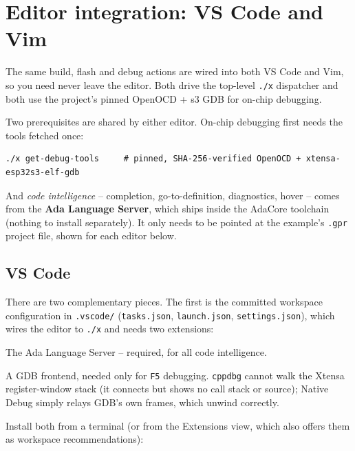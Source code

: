 \section{Editor integration: VS Code and Vim}

The same build, flash and debug actions are wired into both VS Code and Vim, so
you need never leave the editor. Both drive the top-level \texttt{./x} dispatcher
and both use the project's pinned OpenOCD + s3 GDB for on-chip debugging.

Two prerequisites are shared by either editor. On-chip debugging first needs the
tools fetched once:

\begin{lstlisting}[style=sh]
./x get-debug-tools     # pinned, SHA-256-verified OpenOCD + xtensa-esp32s3-elf-gdb
\end{lstlisting}

And \emph{code intelligence} -- completion, go-to-definition, diagnostics, hover
-- comes from the \textbf{Ada Language Server}, which ships inside the AdaCore
toolchain (nothing to install separately). It only needs to be pointed at the
example's \texttt{.gpr} project file, shown for each editor below.

\subsection{VS Code}

There are two complementary pieces. The first is the committed workspace
configuration in \texttt{.vscode/} (\texttt{tasks.json}, \texttt{launch.json},
\texttt{settings.json}), which wires the editor to \texttt{./x} and needs two
extensions:

\begin{description}[style=nextline]
\item[Ada \& SPARK (\texttt{AdaCore.ada}).] The Ada Language Server -- required,
  for all code intelligence.
\item[Native Debug (\texttt{webfreak.debug}).] A GDB frontend, needed only for
  \texttt{F5} debugging. \texttt{cppdbg} cannot walk the Xtensa register-window
  stack (it connects but shows no call stack or source); Native Debug simply
  relays GDB's own frames, which unwind correctly.
\end{description}

Install both from a terminal (or from the Extensions view, which also offers them
as workspace recommendations):

